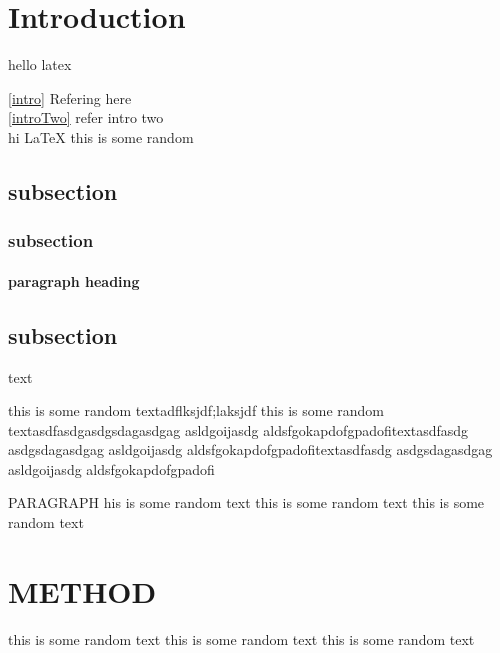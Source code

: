 
%

\section{Introduction}
hello latex

\ref{intro} Refering here\\

\ref{introTwo} refer intro two\\
hi \LaTeX
this is some random        
\subsection{subsection}     
\blindtext 
\subsubsection{subsection}    \blindtext  
\paragraph{paragraph heading} \blindtext
\subsection{subsection}        text 

this is some random textadflksjdf;laksjdf
this is some random textasdfasdgasdgsdagasdgag asldgoijasdg aldsfgokapdofgpadofitextasdfasdg
asdgsdagasdgag asldgoijasdg aldsfgokapdofgpadofitextasdfasdg
asdgsdagasdgag asldgoijasdg aldsfgokapdofgpadofi
\par PARAGRAPH his is some random text
this is some random text
this is some random text

\section{METHOD}
this is some random text
this is some random text
this is some random text

